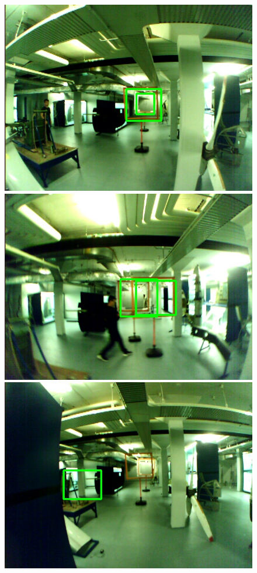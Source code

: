 \begin{figure}[hbtp]
\begin{minipage}{0.24\textwidth}
	\includegraphics[width=\textwidth]{fig/examples/basement_nice1.jpg}
\end{minipage}
\begin{minipage}{0.24\textwidth}
	\includegraphics[width=\textwidth]{fig/examples/basement_nice2.jpg}
\end{minipage}
\begin{minipage}{0.24\textwidth}
	\includegraphics[width=\textwidth]{fig/examples/basement_notnice1.jpg}

\end{minipage}
\end{figure}
